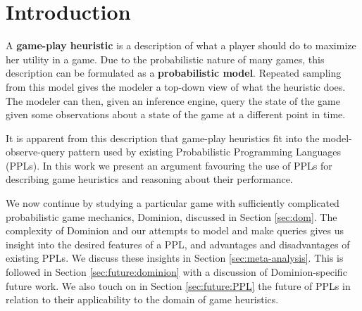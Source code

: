 
\section{Introduction} \label{sec:intro}
A {\bf game-play heuristic} is a description of what a player should do to maximize her
utility in a game. Due to the probabilistic nature of many games, this description
can be formulated as a {\bf probabilistic model}. Repeated sampling from this model
gives the modeler a top-down view of what the heuristic does.
The modeler can then, given an inference engine, query the state of the game given
some observations about a state of the game at a different point in time.

It is apparent from this description that game-play heuristics fit
into the model-observe-query pattern used by existing Probabilistic Programming
Languages (PPLs).
In this work we present an argument favouring the use of PPLs
for describing game heuristics and reasoning about their performance.

We now continue by studying a particular game with sufficiently
complicated probabilistic game mechanics, Dominion, discussed in Section
\ref{sec:dom}.
The complexity of Dominion and our attempts to model and make queries gives
us insight into the desired features of a PPL, and advantages and disadvantages
of existing PPLs. We discuss these insights in Section \ref{sec:meta-analysis}.
This is followed in Section \ref{sec:future:dominion} with a discussion of
Dominion-specific future work. We also touch on in Section \ref{sec:future:PPL}
the future of PPLs in relation to their applicability to the domain of
game heuristics.




